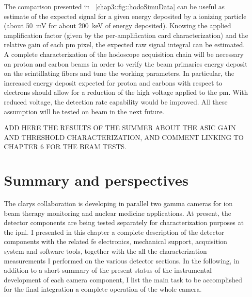 The comparison presented in \figurename~\ref{chap3::fig::hodoSimuData} can be useful as estimate of the expected signal for a given energy deposited by a ionizing particle (about 50~mV for about 200~keV of energy deposited). Knowing the applied amplification factor (given by the per-amplification card characterization) and the relative gain of each \gls{pm} pixel, the expected raw signal integral can be estimated.\\
A complete characterization of the hodoscope acquisition chain will be necessary on proton and carbon beams in order to verify the beam primaries energy deposit on the scintillating fibers and tune the working parameters. In particular, the increased energy deposit expected for proton and carbons with respect to electrons should allow for a reduction of the high voltage applied to the \gls{pm}. With reduced voltage, the detection rate capability would be improved. All these assumption will be tested on beam in the next future.

ADD HERE THE RESULTS OF THE SUMMER ABOUT THE ASIC GAIN AND THRESHOLD CHARACTERIZATION, AND COMMENT LINKING TO CHAPTER 6 FOR THE BEAM TESTS. 



\section{Summary and perspectives}\label{chap3::sec::Next}

The \gls{clarys} collaboration is developing in parallel two gamma cameras for ion beam therapy monitoring and nuclear medicine applications. At present, the detector components are being tested separately for characterization purposes at the \gls{ipnl}. I presented in this chapter a complete description of the detector components with the related \gls{fe} electronics, mechanical support, acquisition system and software tools, together with the all the characterization measurements I performed on the various detector sections. In the following, in addition to a short summary of the present status of the instrumental development of each camera component, I list the main task to be accomplished for the final integration a complete operation of the whole camera. 

